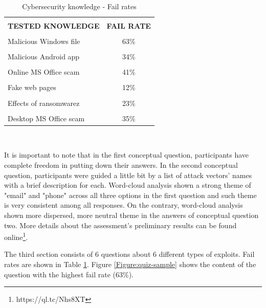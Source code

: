 \documentclass[conference]{IEEEtran}
\begin{document}
\begin{table}[]
\begin{center}
\begin{tabular}{|l|c|}
\hline
{}&{} \\[-0.5em] 
{\textbf{TESTED KNOWLEDGE} } & \textbf{FAIL RATE} \\[2pt] \hline
& \\[-0.8em] 
Malicious Windows file                          & 63\%                 \\[2pt] \hline
{}&{} \\[-0.8em] 
Malicious Android app                           & 34\%                 \\[2pt] \hline
{}&{} \\[-0.8em] 
Online MS Office scam                           & 41\%                 \\[2pt] \hline
{}&{} \\[-0.8em] 
Fake web pages                                  & 12\%                 \\[2pt] \hline
{}&{} \\[-0.8em] 
Effects of ransomwarez                          & 23\%                 \\[2pt] \hline
{}&{} \\[-0.8em] 
Desktop MS Office scam                          & 35\%                 \\[2pt] \hline
\end{tabular}
\end{center}
 \\
\caption{Cybersecurity knowledge - Fail rates}
\label{Table:FailRate}
\end{table}
It is important to note that in the first conceptual question, participants have complete freedom in putting down their answers. In the second conceptual question, participants were guided a little bit by a list of attack vectors' names with a brief description for each. Word-cloud analysis shown a strong theme of "email" and "phone" across all three options in the first question and such theme is very consistent among all responses. On the contrary, word-cloud analysis shown more dispersed, more neutral theme in the answers of conceptual question two. More details about the assessment's preliminary results can be found online\footnote{https://ql.tc/Nhs8XT}.

The third section consists of 6 questions about 6 different types of exploits. Fail rates are shown in Table \ref{Table:FailRate}. Figure \ref{Figure:quiz-sample} shows the content of the question with the highest fail rate (63\%).
\end{document}
